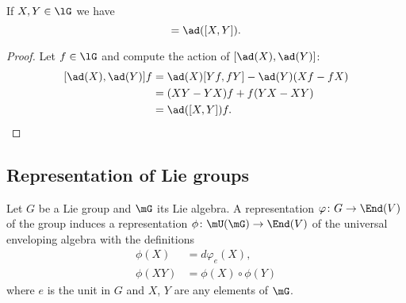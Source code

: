 \begin{lemma}       \label{LemAdesthioo}
    If \( X,Y\in\lG\) we have
    \begin{equation}
        [\ad(X),\ad(Y)]=\ad([X,Y]).
    \end{equation}
\end{lemma}

\begin{proof}
    Let \( f\in\lG\) and compute the action of \( [\ad(X),\ad(Y)]\):
    \begin{subequations}
        \begin{align}
            [\ad(X),\ad(Y)]f&=\ad(X)[Yf,fY]-\ad(Y)(Xf-fX)\\
            &=(XY-YX)f+f(YX-XY)\\
            &=\ad([X,Y])f.
        \end{align}
    \end{subequations}
\end{proof}

                    \subsection{Representation of Lie groups}

\begin{proposition}
    Let $G$ be a Lie group and $\mG$ its Lie algebra. A representation $\varphi\colon G\to \End(V)$ of the group induces a representation $\phi\colon \mU(\mG)\to \End(V)$ of the universal enveloping algebra with the definitions
    \begin{subequations}
        \begin{align}
            \phi(X)     &=d\varphi_e(X),\\
            \phi(XY)    &=\phi(X)\circ\phi(Y)
        \end{align}
    \end{subequations}
    where $e$ is the unit in $G$ and $X$, $Y$ are any elements of $\mG$.
\end{proposition}

